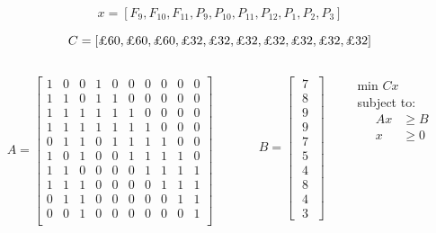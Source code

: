 \documentclass{beamer}
\begin{document}
\begin{frame}
  $$x = \left[F_9, F_{10}, F_{11}, P_9, P_{10}, P_{11}, P_{12}, P_{1}, P_{2}, P_{3}\right]$$

  $$C = \left[\text{\textsterling} 60, \text{\textsterling} 60, \text{\textsterling} 60, \text{\textsterling} 32, \text{\textsterling} 32, \text{\textsterling} 32, \text{\textsterling} 32, \text{\textsterling} 32, \text{\textsterling} 32, \text{\textsterling} 32\right]$$

  \begin{columns}
    \begin{column}{0.5\textwidth}
      $$A =
      \begin{bmatrix}
        1 & 0 & 0 & 1 & 0 & 0 & 0 & 0 & 0 & 0 \\
        1 & 1 & 0 & 1 & 1 & 0 & 0 & 0 & 0 & 0 \\
        1 & 1 & 1 & 1 & 1 & 1 & 0 & 0 & 0 & 0 \\
        1 & 1 & 1 & 1 & 1 & 1 & 1 & 0 & 0 & 0 \\
        0 & 1 & 1 & 0 & 1 & 1 & 1 & 1 & 0 & 0 \\
        1 & 0 & 1 & 0 & 0 & 1 & 1 & 1 & 1 & 0 \\
        1 & 1 & 0 & 0 & 0 & 0 & 1 & 1 & 1 & 1 \\
        1 & 1 & 1 & 0 & 0 & 0 & 0 & 1 & 1 & 1 \\
        0 & 1 & 1 & 0 & 0 & 0 & 0 & 0 & 1 & 1 \\
        0 & 0 & 1 & 0 & 0 & 0 & 0 & 0 & 0 & 1 \\
      \end{bmatrix}$$
    \end{column}
    \begin{column}{0.3\textwidth}
      $$B = \left[\;\begin{matrix} 7 \\ 8 \\ 9 \\ 9 \\ 7 \\ 5 \\ 4 \\ 8 \\ 4 \\ 3 \end{matrix}\;\right]$$
    \end{column}
    \begin{column}{0.2\textwidth}
      min $Cx$\\
      subject to:
      \begin{align*}
        A x &\geq B\\
        x &\geq 0
      \end{align*}
    \end{column}
  \end{columns}
\end{frame}
\end{document}
